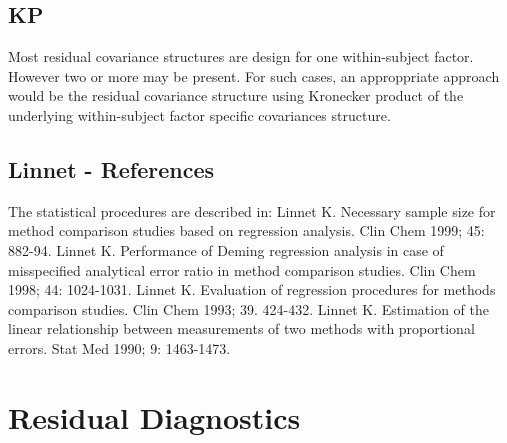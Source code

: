 \documentclass[12pt, a4paper]{report}
\theoremstyle{plain}
\theoremstyle{definition}
\theoremstyle{remark}
\begin{document}
\section{KP}
Most residual covariance structures are design for one
within-subject factor. However two or more may be present. For
such cases, an approppriate approach would be the residual
covariance structure using Kronecker product of the underlying
within-subject factor specific covariances structure.


\section{Linnet - References}
The statistical procedures are described in:
Linnet K. Necessary sample size for method comparison studies based on regression analysis. Clin Chem 1999; 45: 882-94.
Linnet K. Performance of Deming regression analysis in case of misspecified analytical error ratio in method comparison studies. Clin Chem 1998; 44: 1024-1031.
Linnet K. Evaluation of regression procedures for methods comparison studies. Clin Chem 1993; 39. 424-432.
Linnet K. Estimation of the linear relationship between measurements of two methods with proportional errors. Stat Med 1990; 9: 1463-1473.


	\chapter{Residual Diagnostics}
\end{document}
